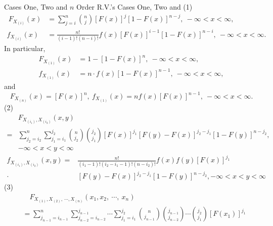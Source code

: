 \documentclass{elegantbook}
\begin{document}
\begin{corollary}{Cases One, Two and $n$ Order R.V.'s }{Cases One, Two and}
(1)
\[\begin{aligned}
\ F_{X_{\left( i \right)}}(x) &= \sum_{j = i}^{n}{\binom{n}{j}\left\lbrack F(x) \right\rbrack^{j}\left\lbrack 1 - F(x) \right\rbrack^{n - j}},\ -\infty < x < \infty,\\
f_{X_{\left( i \right)}}(x) &= \frac{n!}{\left( i - 1 \right)!\left( n - i \right)!}f(x)\left\lbrack F(x) \right\rbrack^{i - 1}\left\lbrack 1 - F(x) \right\rbrack^{n - i},\ -\infty < x < \infty.
\end{aligned}\]
In particular,
\[\begin{aligned}
F_{X_{\left( 1 \right)}}(x) &= 1 - \left\lbrack 1 - F(x) \right\rbrack^{n},\ -\infty < x < \infty,\\
f_{X_{\left( 1 \right)}}(x) &= n\cdot f(x)\left\lbrack 1 - F(x) \right\rbrack^{n - 1},\ -\infty < x < \infty,
\end{aligned}\]
and
\[F_{X_{\left( n \right)}}(x) = \left\lbrack F(x) \right\rbrack^{n},\ f_{X_{\left( 1 \right)}}(x) = nf(x)\left\lbrack F(x) \right\rbrack^{n - 1},\ -\infty < x < \infty.\]
(2)
\[\begin{aligned}
&F_{X_{\left( i_{1} \right)},X_{\left( i_{2} \right)}}(x,y)\\
=& \sum_{j_{2} = i_{2}}^{n}{\sum_{j_{1} = i_{1}}^{j_{2}}{\binom{n}{j_{2}}  \binom{j_{2}}{j_{1}} \left\lbrack F(x) \right\rbrack^{j_{1}}\left\lbrack F(y) - F(x) \right\rbrack^{j_{2} - j_{1}}\left\lbrack 1 - F(y) \right\rbrack^{n - j_{2}}}},\\
& - \infty < x < y < \infty
\end{aligned}\]
\[\begin{aligned}
f_{X_{\left( i_{1} \right)},X_{\left( i_{2} \right)}}(x,y) =& \frac{n!}{\left( i_{1} - 1 \right)!\left( i_{2} - i_{1} - 1 \right)!\left( n - i_{2} \right)!}f(x)f(y)\left\lbrack F(x) \right\rbrack^{j_{1}}
\\
\cdot &\left\lbrack F(y) - F(x) \right\rbrack^{j_{2} - j_{1}}\left\lbrack 1 - F(y) \right\rbrack^{n - j_{2}}, - \infty < x < y < \infty
\end{aligned}\]
(3)
\[\begin{aligned}
&\quad F_{X_{(1)},X_{(2)},\ \cdots,X_{(n)}}\left( x_{1},x_{2},\ \cdots,\ x_{n} \right)\\
&= \sum_{j_{n - 1} = i_{n - 1}}^{n}{\sum_{j_{n - 2} = i_{n - 2}}^{j_{n - 1}}\cdots}\sum_{j_{1} = i_{1}}^{j_{2}} \binom{n}{j_{n - 1}}  \binom{j_{n - 1}}{j_{n - 2}} \cdots\binom{j_{2}}{j_{1}}\left\lbrack F( x_{1} ) \right\rbrack^{j_{1}}\\

\end{aligned}\]
\end{corollary}
\end{document}
